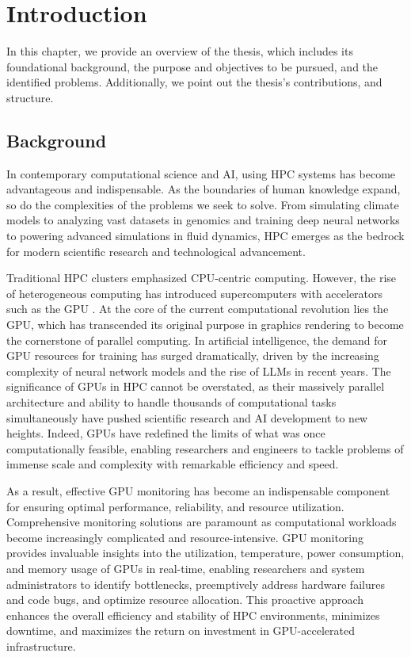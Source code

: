 \chapter{Introduction}
\label{chap:introduction}
In this chapter, we provide an overview of the thesis, which includes its foundational background, the purpose and objectives to be pursued, and the identified problems. Additionally, we point out the thesis's contributions, and structure.

\section{Background}
In contemporary computational science and AI, using HPC systems has become advantageous and indispensable. As the boundaries of human knowledge expand, so do the complexities of the problems we seek to solve. From simulating climate models to analyzing vast datasets in genomics and training deep neural networks to powering advanced simulations in fluid dynamics, HPC emerges as the bedrock for modern scientific research and technological advancement.

Traditional HPC clusters emphasized CPU-centric computing. However, the rise of heterogeneous computing has introduced supercomputers with accelerators such as the GPU \cite{5289128}. At the core of the current computational revolution lies the GPU, which has transcended its original purpose in graphics rendering to become the cornerstone of parallel computing. In artificial intelligence, the demand for GPU resources for training has surged dramatically, driven by the increasing complexity of neural network models and the rise of LLMs in recent years. The significance of GPUs in HPC cannot be overstated, as their massively parallel architecture and ability to handle thousands of computational tasks simultaneously have pushed scientific research and AI development to new heights. Indeed, GPUs have redefined the limits of what was once computationally feasible, enabling researchers and engineers to tackle problems of immense scale and complexity with remarkable efficiency and speed.

As a result, effective GPU monitoring has become an indispensable component for ensuring optimal performance, reliability, and resource utilization. Comprehensive monitoring solutions are paramount as computational workloads become increasingly complicated and resource-intensive. GPU monitoring provides invaluable insights into the utilization, temperature, power consumption, and memory usage of GPUs in real-time, enabling researchers and system administrators to identify bottlenecks, preemptively address hardware failures and code bugs, and optimize resource allocation. This proactive approach enhances the overall efficiency and stability of HPC environments, minimizes downtime, and maximizes the return on investment in GPU-accelerated infrastructure.

